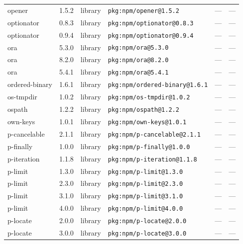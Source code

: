 \documentclass[11pt,a4paper]{article}
\begin{document}
\begin{longtable}{|p{4cm}|p{2cm}|p{1.6cm}|p{5cm}|p{1.5cm}|p{3.5cm}|}
\raggedright opener & 1.5.2 & library & \small\texttt{pkg:npm/opener@1.5.2} & — & \small — \\
\raggedright optionator & 0.8.3 & library & \small\texttt{pkg:npm/optionator@0.8.3} & — & \small — \\
\raggedright optionator & 0.9.4 & library & \small\texttt{pkg:npm/optionator@0.9.4} & — & \small — \\
\raggedright ora & 5.3.0 & library & \small\texttt{pkg:npm/ora@5.3.0} & — & \small — \\
\raggedright ora & 8.2.0 & library & \small\texttt{pkg:npm/ora@8.2.0} & — & \small — \\
\raggedright ora & 5.4.1 & library & \small\texttt{pkg:npm/ora@5.4.1} & — & \small — \\
\raggedright ordered-binary & 1.6.1 & library & \small\texttt{pkg:npm/ordered-binary@1.6.1} & — & \small — \\
\raggedright os-tmpdir & 1.0.2 & library & \small\texttt{pkg:npm/os-tmpdir@1.0.2} & — & \small — \\
\raggedright ospath & 1.2.2 & library & \small\texttt{pkg:npm/ospath@1.2.2} & — & \small — \\
\raggedright own-keys & 1.0.1 & library & \small\texttt{pkg:npm/own-keys@1.0.1} & — & \small — \\
\raggedright p-cancelable & 2.1.1 & library & \small\texttt{pkg:npm/p-cancelable@2.1.1} & — & \small — \\
\raggedright p-finally & 1.0.0 & library & \small\texttt{pkg:npm/p-finally@1.0.0} & — & \small — \\
\raggedright p-iteration & 1.1.8 & library & \small\texttt{pkg:npm/p-iteration@1.1.8} & — & \small — \\
\raggedright p-limit & 1.3.0 & library & \small\texttt{pkg:npm/p-limit@1.3.0} & — & \small — \\
\raggedright p-limit & 2.3.0 & library & \small\texttt{pkg:npm/p-limit@2.3.0} & — & \small — \\
\raggedright p-limit & 3.1.0 & library & \small\texttt{pkg:npm/p-limit@3.1.0} & — & \small — \\
\raggedright p-limit & 4.0.0 & library & \small\texttt{pkg:npm/p-limit@4.0.0} & — & \small — \\
\raggedright p-locate & 2.0.0 & library & \small\texttt{pkg:npm/p-locate@2.0.0} & — & \small — \\
\raggedright p-locate & 3.0.0 & library & \small\texttt{pkg:npm/p-locate@3.0.0} & — & \small — \\

\end{longtable}
\end{document}

